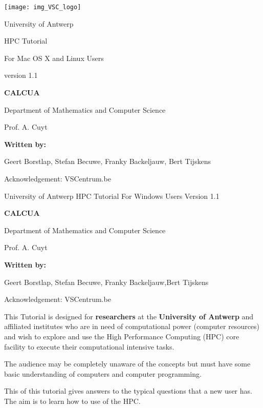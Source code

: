 \texttt{[image: img\_VSC\_logo]}

University of Antwerp

HPC Tutorial

For Mac OS X and Linux Users

version 1.1


\textbf{CALCUA}

Department of Mathematics and Computer Science

Prof. A. Cuyt



\textbf{Written by:}

Geert Borstlap, Stefan Becuwe, Franky Backeljauw, Bert Tijskens

Acknowledgement: VSCentrum.be


University of Antwerp
HPC Tutorial
For Windows Users
Version 1.1

\textbf{CALCUA}

Department of Mathematics and Computer Science

Prof. A. Cuyt



\textbf{Written by:}

Geert Borstlap, Stefan Becuwe, Franky Backeljauw,Bert Tijskens



Acknowledgement: VSCentrum.be

\textbf{}

This \hpc Tutorial is designed for \textbf{researchers} at the \textbf{University of Antwerp} and affiliated institutes who are in need of computational power (computer resources) and wish to explore and use the High Performance Computing (HPC) core facility to execute their computational intensive tasks.


The audience may be completely unaware of the \hpc concepts but must have some basic understanding of computers and computer programming.



This  of this tutorial gives answers to the typical
questions that a new \hpc user has. The aim is to learn how to use of the
HPC.

